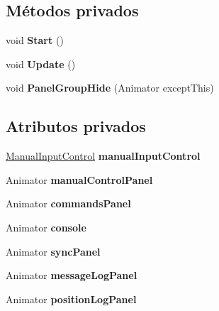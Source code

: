 \subsection*{Métodos privados}
\begin{DoxyCompactItemize}
\item 
\mbox{\label{class_panel_control_a6fb7e28ad845a0c03653637a123fd174}} 
void {\bfseries Start} ()
\item 
\mbox{\label{class_panel_control_abc0985a11a88ccc706a665f1573fffb5}} 
void {\bfseries Update} ()
\item 
\mbox{\label{class_panel_control_a89ad407cadb68b103021f66db72c8716}} 
void {\bfseries Panel\+Group\+Hide} (Animator except\+This)
\end{DoxyCompactItemize}
\subsection*{Atributos privados}
\begin{DoxyCompactItemize}
\item 
\mbox{\label{class_panel_control_ac8c59ded2a6ef4f648a58582265b83be}} 
\mbox{\hyperlink{class_manual_input_control}{Manual\+Input\+Control}} {\bfseries manual\+Input\+Control}
\item 
\mbox{\label{class_panel_control_a1677195f4ad88a047d549ebbe634d713}} 
Animator {\bfseries manual\+Control\+Panel}
\item 
\mbox{\label{class_panel_control_affbc9e06d9bc16e095bbf67029c6959b}} 
Animator {\bfseries commands\+Panel}
\item 
\mbox{\label{class_panel_control_ace602f976c43c94c566275af3bbb616e}} 
Animator {\bfseries console}
\item 
\mbox{\label{class_panel_control_a8f296399aa653e2d120896f09e72760f}} 
Animator {\bfseries sync\+Panel}
\item 
\mbox{\label{class_panel_control_add908e440cb683e09aedd6a976133140}} 
Animator {\bfseries message\+Log\+Panel}
\item 
\mbox{\label{class_panel_control_a82471f542f9bbd18007cffd0a83cdd08}} 
Animator {\bfseries position\+Log\+Panel}
\end{DoxyCompactItemize}


